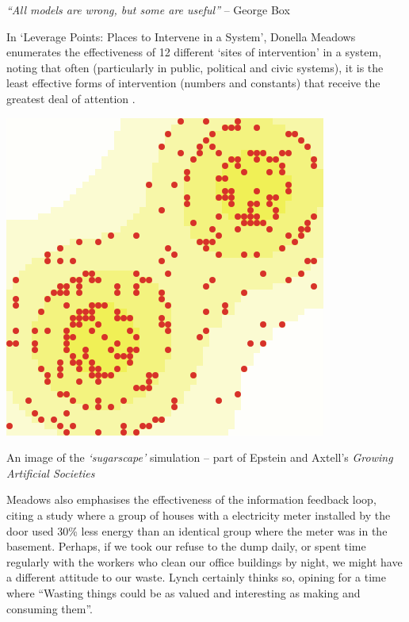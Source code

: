 \documentclass[nofonts,nols,justified,nobib]{tufte-book}
\begin{document}

\begin{flushright}
\emph{``All models are wrong, but some are useful''}
-- George Box
\end{flushright}

In `Leverage Points: Places to Intervene in a System', Donella Meadows enumerates the effectiveness of 12 different `sites of intervention' in a system, noting that often (particularly in public, political and civic systems), it is the least effective forms of intervention (numbers and constants) that receive the greatest deal of attention \cite{meadows_leverage_1997}. 
\begin{marginfigure}
\includegraphics[width=\textwidth]{img/1/sugarscape.png}
\caption{An image of the \emph{`sugarscape'} simulation -- part of Epstein and Axtell's \emph{Growing Artificial Societies} \cite{epstein_growing_1996-1}}
\end{marginfigure}
Meadows also emphasises the effectiveness of the information feedback loop, citing a study where a group of houses with a electricity meter installed by the door used 30\% less energy than an identical group where the meter was in the basement. Perhaps, if we took our refuse to the dump daily, or spent time regularly with the workers who clean our office buildings by night, we might have a different attitude to our waste. Lynch certainly thinks so, opining for a time where ``Wasting things could be as valued and interesting as making and consuming them''. %
\end{document}
